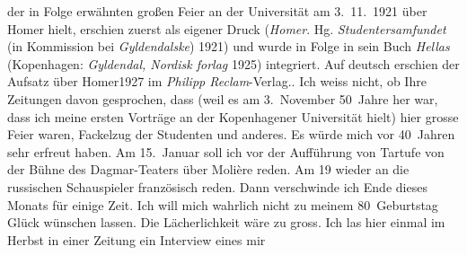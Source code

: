 \begin{ledgroupsized}[t]{13cm}
{{{                  der in Folge erwähnten großen Feier an der Universität am 3. 11. 1921 über Homer hielt, erschien zuerst als eigener Druck (\emph{Homer}. Hg. \emph{Studentersamfundet} (in Kommission bei
                        \emph{Gyldendalske}) 1921) und wurde in
                  Folge in sein Buch \emph{Hellas} (Kopenhagen:
                        \emph{Gyldendal, Nordisk forlag}{ }1925) integriert. Auf deutsch erschien der Aufsatz über Homer1927 im \emph{Philipp
                  Reclam}-Verlag.}}}\label{K_L02373_1h}.\pend
           \pstart
           Ich weiss nicht, ob Ihre Zeitungen davon gesprochen, dass (weil es am
                  3. November 50 Jahre her war, dass ich meine ersten Vorträge an der
                  Kopenhagener Universität hielt) hier grosse Feier
               waren, Fackelzug der Studenten {\pb}und anderes. Es würde mich vor 40 Jahren sehr erfreut haben.\pend
           \pstart
           Am 15. Januar soll ich vor der Aufführung von Tartufe von der Bühne des Dagmar-Teaters über Molière reden. Am
                  19 wieder an die russischen
               Schauspieler französisch reden.\pend
           \pstart
           Dann verschwinde ich Ende dieses Monats für einige Zeit. Ich will mich wahrlich nicht
               zu meinem 80 Geburtstag Glück wünschen lassen. Die Lächerlichkeit wäre zu gross.\pend
           \pstart
           Ich las hier einmal im Herbst in einer Zeitung ein
               Interview eines mir

\end{ledgroupsized}
